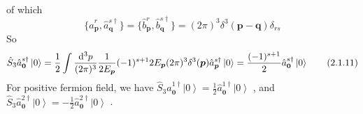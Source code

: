 \documentclass[12pt]{article}
\begin{document}
\begin{spacing}{1.5}
\begin{equation}
\begin{aligned}
\end{aligned}
	\tag{2.1.9}
\end{equation}
of which
\begin{equation}
\{ \hat a^{r}_{\bm p}, \hat a^{s\dagger}_{\bm q} \}=\{ \hat b^{r}_{\bm p}, \hat b^{s\dagger}_{\bm q} \}=(2\pi)^{3}\delta^{3}(\bm p-\bm q)\delta_{rs}
	\tag{2.1.10}
\end{equation}
So 
\begin{equation}
\hat S_{3}\hat a^{s\dagger}_{\bm0} \left|0\right> = \frac{1}{2} \int \frac{\mathop{}\!\mathrm{d}^{3} p}{(2\pi)^{3}}\frac{1}{2E_{\bm p}} (-1)^{s+1}2E_{\bm p}(2\pi)^{3}\delta^{3}(\bm p) \hat a^{s\dagger}_{\bm p} \left|0\right> = \frac{(-1)^{s+1}}{2}\hat a^{s\dagger}_{\bm 0} \left|0\right>
	\tag{2.1.11}
\end{equation}
For positive fermion field, we have $\displaystyle \hat S_{3}\hat a^{1\dagger}_{\bm0} \left|0\right> = \frac{1}{2} \hat a^{1\dagger}_{\bm0} \left|0\right> $ , and $\displaystyle \hat S_{3}\hat a^{2\dagger}_{\bm0} \left|0\right> = -\frac{1}{2} \hat a^{2\dagger}_{\bm0} \left|0\right> $ .\\
~\\
~\\


\end{spacing}
\end{document}
